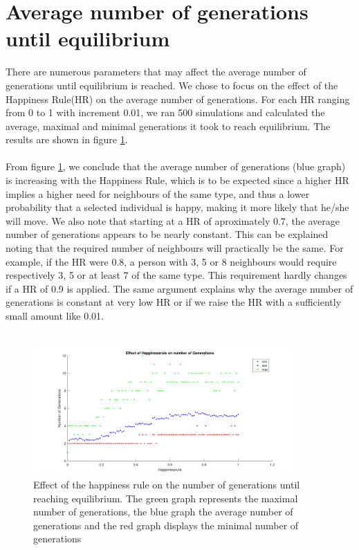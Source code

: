 
\section{Average number of generations until equilibrium}
There are numerous parameters that may affect the average number of generations until  equilibrium is reached. We chose to focus on the effect of the Happiness Rule(HR) on the average number of generations. For each HR ranging from 0 to 1 with increment 0.01, we ran 500 simulations and calculated the average, maximal and minimal generations it took to reach equilibrium. The results are shown in figure \ref{fig:avegen}.\\
\\
From figure \ref{fig:avegen}, we conclude that the average number of generations (blue graph) is increasing with the Happiness Rule, which is to be expected since a higher HR implies a higher need for neighbours of the same type, and thus a lower probability that a selected individual is happy, making it more likely that he/she will move. We also note that starting at a HR of aproximately 0.7, the average number of generations appears to be nearly constant. This can be explained noting that the required number of neighbours will practically be the same. For example, if the HR were 0.8, a person with 3, 5 or 8 neighbours would require respectively 3, 5 or at least 7 of the same type. This requirement hardly changes if a HR of 0.9 is applied. The same argument explains why the average number of generations is constant at very low HR or if we raise the HR with a sufficiently small amount like 0.01.\\
\\
\begin{figure}[h!]
    \centering
    \includegraphics[width=0.9\textwidth]{happinessregel_aantgen_2.pdf}
    \caption{Effect of the happiness rule on the number of generations until reaching equilibrium. The green graph represents the maximal number of generations, the blue graph the average number of generations and the red graph displays the minimal number of generations}
    \label{fig:avegen}
\end{figure}
